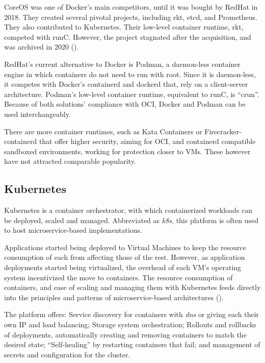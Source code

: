 \documentclass[11pt]{article}
\begin{document}
\begin{flushleft}
    CoreOS was one of Docker's main competitors, until it was bought by RedHat in 2018. They created several pivotal projects, including rkt, etcd, and Prometheus. They also contributed to Kubernetes. Their low-level container runtime, rkt, competed with runC. However, the project stagnated after the acquisition, and was archived in 2020 (\cite{rktarchived}). 
    \linebreak
    
    RedHat's current alternative to Docker is Podman, a daemon-less container engine in which containers do not need to run with root. Since it is daemon-less, it competes with Docker's containerd and dockerd that, rely on a client-server architecture. Podman's low-level container runtime, equivalent to runC, is ``crun''. Because of both solutions' compliance with OCI, Docker and Podman can be used interchangeably.
    \linebreak

    There are more container runtimes, such as Kata Containers or Firecracker-containerd that offer higher security, aiming for OCI, and containerd compatible sandboxed environments, working for protection closer to VMs. These however have not attracted comparable popularity.





    
    \clearpage
    \subsection{Kubernetes}
    Kubernetes is a container orchestrator, with which containerized workloads can be deployed, scaled and managed. Abbreviated as \textit{\acrshort{k8s}}, this platform is often used to host microservice-based implementations. 
    \linebreak
    
    Applications started being deployed to Virtual Machines to keep the resource consumption of each from affecting those of the rest. However, as application deployments started being virtualized, the overhead of each VM's operating system incentivized the move to containers. The resource consumption of containers, and ease of scaling and managing them with Kubernetes feeds directly into the principles and patterns of microservice-based architectures (\cite{k8soverview}). 
    \linebreak

    The platform offers: Service discovery for containers with \textit{\acrshort{dns}} or giving each their own IP and load balancing; Storage system orchestration; Rollouts and rollbacks of deployments, automatically creating and removing containers to match the desired state; ``Self-healing'' by restarting containers that fail; and management of secrets and configuration for the cluster.
    \linebreak


\end{flushleft}
\end{document}
